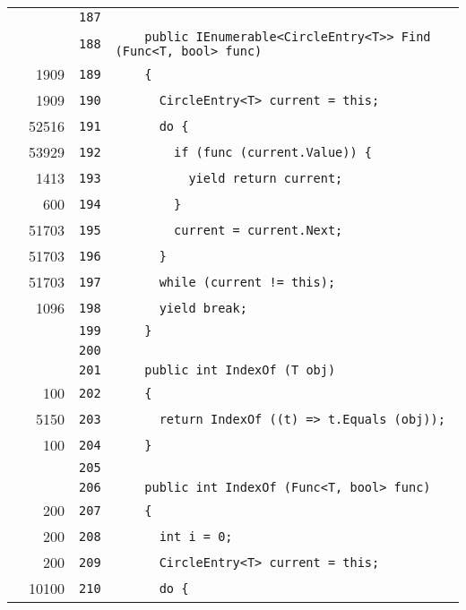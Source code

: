 \documentclass[a4paper,10pt]{article}
\begin{document}
\begin{longtable}[l]{lrrl}
\cellcolor{gray} &  & \verb~187~ & \verb~~\\
\cellcolor{gray} &  & \verb~188~ & \verb~    public IEnumerable<CircleEntry<T>> Find (Func<T, bool> func)~\\
\cellcolor{green} & 1909 & \verb~189~ & \verb~    {~\\
\cellcolor{green} & 1909 & \verb~190~ & \verb~      CircleEntry<T> current = this;~\\
\cellcolor{green} & 52516 & \verb~191~ & \verb~      do {~\\
\cellcolor{green} & 53929 & \verb~192~ & \verb~        if (func (current.Value)) {~\\
\cellcolor{green} & 1413 & \verb~193~ & \verb~          yield return current;~\\
\cellcolor{green} & 600 & \verb~194~ & \verb~        }~\\
\cellcolor{green} & 51703 & \verb~195~ & \verb~        current = current.Next;~\\
\cellcolor{green} & 51703 & \verb~196~ & \verb~      }~\\
\cellcolor{green} & 51703 & \verb~197~ & \verb~      while (current != this);~\\
\cellcolor{green} & 1096 & \verb~198~ & \verb~      yield break;~\\
\cellcolor{gray} &  & \verb~199~ & \verb~    }~\\
\cellcolor{gray} &  & \verb~200~ & \verb~~\\
\cellcolor{gray} &  & \verb~201~ & \verb~    public int IndexOf (T obj)~\\
\cellcolor{green} & 100 & \verb~202~ & \verb~    {~\\
\cellcolor{green} & 5150 & \verb~203~ & \verb~      return IndexOf ((t) => t.Equals (obj));~\\
\cellcolor{green} & 100 & \verb~204~ & \verb~    }~\\
\cellcolor{gray} &  & \verb~205~ & \verb~~\\
\cellcolor{gray} &  & \verb~206~ & \verb~    public int IndexOf (Func<T, bool> func)~\\
\cellcolor{green} & 200 & \verb~207~ & \verb~    {~\\
\cellcolor{green} & 200 & \verb~208~ & \verb~      int i = 0;~\\
\cellcolor{green} & 200 & \verb~209~ & \verb~      CircleEntry<T> current = this;~\\
\cellcolor{green} & 10100 & \verb~210~ & \verb~      do {~\\

\end{longtable}
\end{document}
